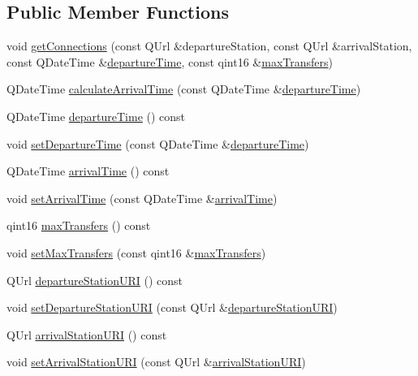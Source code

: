 \subsection*{Public Member Functions}
\begin{DoxyCompactItemize}
\item 
void \mbox{\hyperlink{classCSA_1_1Planner_aebe12cc6eabe41e6e843ebab182d44ab}{get\+Connections}} (const Q\+Url \&departure\+Station, const Q\+Url \&arrival\+Station, const Q\+Date\+Time \&\mbox{\hyperlink{classCSA_1_1Planner_affe50069469ecc6b75c69efdb408b71a}{departure\+Time}}, const qint16 \&\mbox{\hyperlink{classCSA_1_1Planner_a2b734fc3d3ae3af744876bdc72898596}{max\+Transfers}})
\item 
Q\+Date\+Time \mbox{\hyperlink{classCSA_1_1Planner_a78671efec5a97e327b77bd2c9e03cf15}{calculate\+Arrival\+Time}} (const Q\+Date\+Time \&\mbox{\hyperlink{classCSA_1_1Planner_affe50069469ecc6b75c69efdb408b71a}{departure\+Time}})
\item 
Q\+Date\+Time \mbox{\hyperlink{classCSA_1_1Planner_affe50069469ecc6b75c69efdb408b71a}{departure\+Time}} () const
\item 
void \mbox{\hyperlink{classCSA_1_1Planner_ac97fdf7ce0d6b9a5f0d74e884927147c}{set\+Departure\+Time}} (const Q\+Date\+Time \&\mbox{\hyperlink{classCSA_1_1Planner_affe50069469ecc6b75c69efdb408b71a}{departure\+Time}})
\item 
Q\+Date\+Time \mbox{\hyperlink{classCSA_1_1Planner_a1ae3eafa8ebde74343828fa98cb588b7}{arrival\+Time}} () const
\item 
void \mbox{\hyperlink{classCSA_1_1Planner_a140baeba635ac0e6d794747aa594e17f}{set\+Arrival\+Time}} (const Q\+Date\+Time \&\mbox{\hyperlink{classCSA_1_1Planner_a1ae3eafa8ebde74343828fa98cb588b7}{arrival\+Time}})
\item 
qint16 \mbox{\hyperlink{classCSA_1_1Planner_a2b734fc3d3ae3af744876bdc72898596}{max\+Transfers}} () const
\item 
void \mbox{\hyperlink{classCSA_1_1Planner_a950c1dc8208d98aab977f490c2e7b244}{set\+Max\+Transfers}} (const qint16 \&\mbox{\hyperlink{classCSA_1_1Planner_a2b734fc3d3ae3af744876bdc72898596}{max\+Transfers}})
\item 
Q\+Url \mbox{\hyperlink{classCSA_1_1Planner_a3b84dde21b6abaf92014af54b1cd7fe8}{departure\+Station\+U\+RI}} () const
\item 
void \mbox{\hyperlink{classCSA_1_1Planner_a562537d6903362f084d8aa08f812d441}{set\+Departure\+Station\+U\+RI}} (const Q\+Url \&\mbox{\hyperlink{classCSA_1_1Planner_a3b84dde21b6abaf92014af54b1cd7fe8}{departure\+Station\+U\+RI}})
\item 
Q\+Url \mbox{\hyperlink{classCSA_1_1Planner_ac412f34346e0bdd24d62b06d8770b150}{arrival\+Station\+U\+RI}} () const
\item 
void \mbox{\hyperlink{classCSA_1_1Planner_aab52e8e5b484f773a33923fd3f29be25}{set\+Arrival\+Station\+U\+RI}} (const Q\+Url \&\mbox{\hyperlink{classCSA_1_1Planner_ac412f34346e0bdd24d62b06d8770b150}{arrival\+Station\+U\+RI}})
\end{DoxyCompactItemize}
